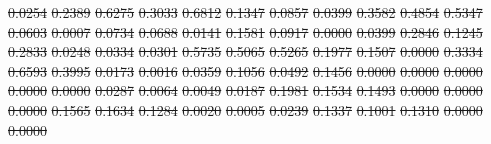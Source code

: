 \documentclass[11pt, a4paper]{book}
\providecommand{\DIFdeltex}[1]{{\protect\color{red}\sout{#1}}}                      %
\providecommand{\DIFdel}[1]{\texorpdfstring{\DIFdeltex{#1}}{}} %
\begin{document}
\DIFdel{0.0254 }%
\DIFdel{0.2389 }%
\DIFdel{0.6275 }%
\DIFdel{0.3033 }%
\DIFdel{0.6812 }%
\DIFdel{0.1347 }%
\DIFdel{0.0857 }%
\DIFdel{0.0399 }%
\DIFdel{0.3582 }%
\DIFdel{0.4854 }%
\DIFdel{0.5347 }%
\DIFdel{0.0603 }%
\DIFdel{0.0007 }%
\DIFdel{0.0734 }%
\DIFdel{0.0688 }%
\DIFdel{0.0141 }%
\DIFdel{0.1581 }%
\DIFdel{0.0917 }%
\DIFdel{0.0000 }%
\DIFdel{0.0399 }%
\DIFdel{0.2846 }%
\DIFdel{0.1245 }%
\DIFdel{0.2833 }%
\DIFdel{0.0248 }%
\DIFdel{0.0334 }%
\DIFdel{0.0301 }%
\DIFdel{0.5735 }%
\DIFdel{0.5065 }%
\DIFdel{0.5265 }%
\DIFdel{0.1977 }%
\DIFdel{0.1507 }%
\DIFdel{0.0000 }%
\DIFdel{0.3334 }%
\DIFdel{0.6593 }%
\DIFdel{0.3995 }%
\DIFdel{0.0173 }%
\DIFdel{0.0016 }%
\DIFdel{0.0359 }%
\DIFdel{0.1056 }%
\DIFdel{0.0492 }%
\DIFdel{0.1456 }%
\DIFdel{0.0000 }%
\DIFdel{0.0000 }%
\DIFdel{0.0000 }%
\DIFdel{0.0000 }%
\DIFdel{0.0000 }%
\DIFdel{0.0287 }%
\DIFdel{0.0064 }%
\DIFdel{0.0049 }%
\DIFdel{0.0187 }%
\DIFdel{0.1981 }%
\DIFdel{0.1534 }%
\DIFdel{0.1493 }%
\DIFdel{0.0000 }%
\DIFdel{0.0000 }%
\DIFdel{0.0000 }%
\DIFdel{0.1565 }%
\DIFdel{0.1634 }%
\DIFdel{0.1284 }%
\DIFdel{0.0020 }%
\DIFdel{0.0005 }%
\DIFdel{0.0239 }%
\DIFdel{0.1337 }%
\DIFdel{0.1001 }%
\DIFdel{0.1310 }%
\DIFdel{0.0000 }%
\DIFdel{0.0000 }%
\end{document}

